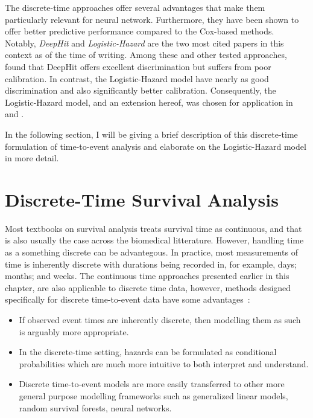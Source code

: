 The discrete-time approaches offer several advantages that 
make them particularly relevant for neural network. 
Furthermore, they have been shown to offer better predictive
performance compared to the Cox-based methods.
~\autocite{kvammeContinuous2021, leeDeepHit2018, gensheimerScalable2019}
Notably, \emph{DeepHit}\autocite{leeDeepHit2018}
and \emph{Logistic-Hazard}\autocite{gensheimerScalable2019}
are the two most cited papers in this context as of the time of writing.
Among these and other tested approaches,
\textcite{kvammeContinuous2021} found that 
DeepHit offers excellent discrimination but suffers from poor calibration.
In contrast, the Logistic-Hazard model have nearly as good discrimination
and also significantly better calibration. 
Consequently, the Logistic-Hazard model, and an extension hereof, 
was chosen for application in 
\studyii{} and \studyiii{}.

In the following section, I will be giving a brief description of
this discrete-time formulation of time-to-event analysis and 
elaborate on the Logistic-Hazard model in more detail.

\section{Discrete-Time Survival Analysis}
\label{sec:disctime-survival}

Most textbooks on survival analysis treats survival time as continuous, 
and that is also usually the case across the biomedical litterature.
However, handling time as a something discrete can be advantegous.
In practice, most measurements of time is inherently discrete 
with durations being recorded in, for example, days; months; and weeks.
The continuous time approaches presented earlier in this chapter, 
are also applicable to discrete time data,
however, methods designed specifically for discrete time-to-event 
data have some advantages~\autocite{tutzModeling2016}:

\begin{itemize}
    \item If observed event times are inherently discrete, 
        then modelling them as such is arguably more appropriate. 
    \item In the discrete-time setting, hazards can be formulated as 
        conditional probabilities which are much more intuitive to 
        both interpret and understand.
    \item Discrete time-to-event models are more easily transferred to 
        other more general purpose modelling frameworks 
        such as generalized linear models, random survival forests, 
        neural networks.
\end{itemize}

